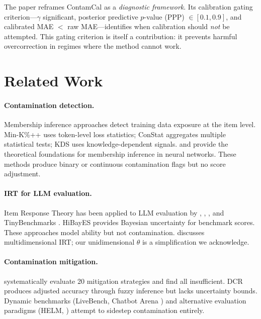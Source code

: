 \documentclass[11pt,a4paper]{article}
\newcommand{\gam}{\gamma}
\begin{document}
The paper reframes ContamCal as a \emph{diagnostic framework}.
Its calibration gating criterion---$\gam$ significant, posterior predictive $p$-value (PPP) $\in [0.1, 0.9]$, and calibrated MAE $<$ raw MAE---identifies when calibration should \emph{not} be attempted.
This gating criterion is itself a contribution: it prevents harmful overcorrection in regimes where the method cannot work.

\section{Related Work}
\label{sec:related}

\paragraph{Contamination detection.}
Membership inference approaches detect training data exposure at the item level.
Min-K\%++ \citep{shi2024detecting} uses token-level loss statistics; ConStat \citep{dekoninck2024constat} aggregates multiple statistical tests; KDS uses knowledge-dependent signals.
\citet{shokri2017membership} and \citet{carlini2021extracting} provide the theoretical foundations for membership inference in neural networks.
These methods produce binary or continuous contamination flags but no score adjustment.

\paragraph{IRT for LLM evaluation.}
Item Response Theory has been applied to LLM evaluation by \citet{martinez2024item}, \citet{lalor2024benchmarking}, \citet{burnell2023rethinking}, and TinyBenchmarks \citep{polo2024tinybenchmarks}.
HiBayES provides Bayesian uncertainty for benchmark scores.
These approaches model ability but not contamination.
\citet{reckase2009multidimensional} discusses multidimensional IRT; our unidimensional $\theta$ is a simplification we acknowledge.

\paragraph{Contamination mitigation.}
\citet{jiang2024investigating} systematically evaluate 20 mitigation strategies and find all insufficient.
DCR \citep{oren2024proving} produces adjusted accuracy through fuzzy inference but lacks uncertainty bounds.
Dynamic benchmarks (LiveBench, Chatbot Arena \citealp{chiang2024chatbot}) and alternative evaluation paradigms (HELM, \citealp{liang2023holistic}) attempt to sidestep contamination entirely.
\end{document}
